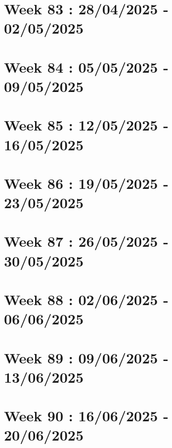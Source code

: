 \documentclass[french]{article}
\begin{document}
	\section{Week 83 : 28/04/2025 - 02/05/2025}

	\section{Week 84 : 05/05/2025 - 09/05/2025}

	\section{Week 85 : 12/05/2025 - 16/05/2025}

	\section{Week 86 : 19/05/2025 - 23/05/2025}

	\section{Week 87 : 26/05/2025 - 30/05/2025}

	\section{Week 88 : 02/06/2025 - 06/06/2025}

	\section{Week 89 : 09/06/2025 - 13/06/2025}

	\section{Week 90 : 16/06/2025 - 20/06/2025}
\end{document}

